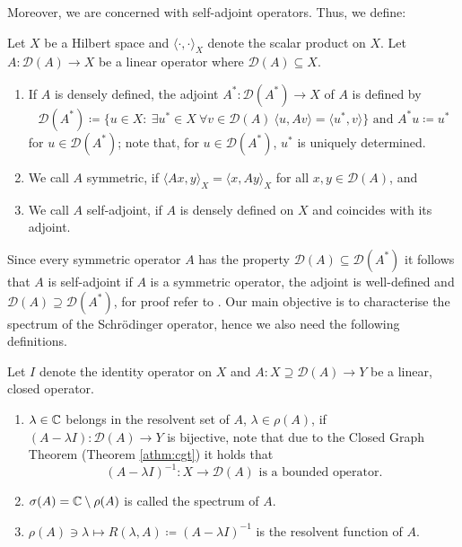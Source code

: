 Moreover, we are concerned with self-adjoint operators. Thus, we define:

\begin{definition}
Let $X$ be a Hilbert space and $\langle \cdot, \cdot \rangle_{X}$ denote the scalar product on $X$. Let $A \colon \mathcal{D}(A) \rightarrow X$ be a linear operator where $\mathcal{D}(A) \subseteq X$.
	\begin{enumerate}[label=\alph*\upshape)]
		\item If $A$ is densely defined, the adjoint $A^{*} \colon \mathcal{D}(A^{*}) \rightarrow X$ of $A$ is defined by 
		\[ \mathcal{D}(A^{*}) \coloneqq \{ u \in X \colon ~\exists u^{*} \in X ~\forall v \in \mathcal{D}(A) ~\langle u, Av \rangle = \langle u^{*} , v \rangle \} \text{ and } A^{*} u \coloneqq u^{*} \] for $u \in \mathcal{D}(A^{*})$; note that, for $u \in \mathcal{D}(A^{*})$, $u^{*}$ is uniquely determined.
		\item We call $A$ symmetric, if $\langle Ax,y \rangle_{X} = \langle x , Ay \rangle_{X}$ for all $x,y \in \mathcal{D}(A)$, and
		\item We call $A$ self-adjoint, if $A$ is densely defined on $X$ and coincides with its adjoint.
	\end{enumerate}
\end{definition}

Since every symmetric operator $A$ has the property $\mathcal{D}(A) \subseteq \mathcal{D}(A^{*})$ it follows that $A$ is self-adjoint if $A$ is a symmetric operator, the adjoint is well-defined and $\mathcal{D}(A) \supseteq \mathcal{D}(A^{*})$, for proof refer to \cite[p. 256]{reed1908methods}. Our main objective is to characterise the spectrum of the Schrödinger operator, hence we also need the following definitions.
~\newpage
\begin{definition}
Let $I$ denote the identity operator on $X$ and $A \colon X \supseteq \mathcal{D}(A) \rightarrow Y$ be a linear, closed operator.
	\begin{enumerate}[label=\alph*\upshape)]
		\item $\lambda \in \mathbb{C}$ belongs in the resolvent set of $A$, $\lambda \in \rho(A)$, if $(A  - \lambda I) \colon \mathcal{D}(A) \rightarrow Y$ is bijective, note that due to the Closed Graph Theorem (Theorem \ref{athm:cgt}) it holds that
			\[ (A - \lambda I)^{-1} \colon X \rightarrow \mathcal{D}(A) \text{ is a bounded operator.} \]
		\item $\sigma(A) = \mathbb{C} \setminus \rho(A)$ is called the spectrum of $A$. 
		\item $\rho(A) \ni \lambda \mapsto R(\lambda, A) \coloneqq (A - \lambda I)^{-1}$ is the resolvent function of $A$.
	\end{enumerate}		
\end{definition}

